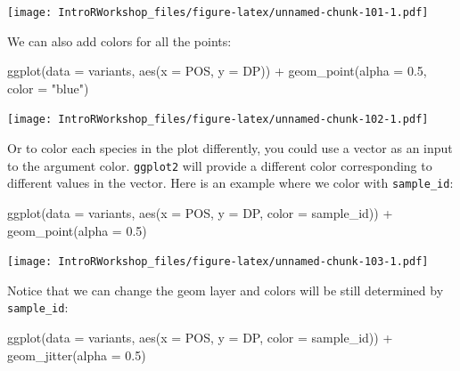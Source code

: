 \documentclass[
]{book}
\newenvironment{Shaded}{\begin{snugshade}}{\end{snugshade}}
\newcommand{\AttributeTok}[1]{\textcolor[rgb]{0.77,0.63,0.00}{#1}}
\newcommand{\FloatTok}[1]{\textcolor[rgb]{0.00,0.00,0.81}{#1}}
\newcommand{\FunctionTok}[1]{\textcolor[rgb]{0.00,0.00,0.00}{#1}}
\newcommand{\NormalTok}[1]{#1}
\newcommand{\SpecialCharTok}[1]{\textcolor[rgb]{0.00,0.00,0.00}{#1}}
\newcommand{\StringTok}[1]{\textcolor[rgb]{0.31,0.60,0.02}{#1}}
\begin{document}
\texttt{[image: IntroRWorkshop\_files/figure-latex/unnamed-chunk-101-1.pdf]}

We can also add colors for all the points:

\begin{Shaded}
\begin{Highlighting}[]
\FunctionTok{ggplot}\NormalTok{(}\AttributeTok{data =}\NormalTok{ variants, }\FunctionTok{aes}\NormalTok{(}\AttributeTok{x =}\NormalTok{ POS, }\AttributeTok{y =}\NormalTok{ DP)) }\SpecialCharTok{+}
  \FunctionTok{geom\_point}\NormalTok{(}\AttributeTok{alpha =} \FloatTok{0.5}\NormalTok{, }\AttributeTok{color =} \StringTok{"blue"}\NormalTok{)}
\end{Highlighting}
\end{Shaded}

\texttt{[image: IntroRWorkshop\_files/figure-latex/unnamed-chunk-102-1.pdf]}

Or to color each species in the plot differently, you could use a vector as an input to the argument color. \texttt{ggplot2} will provide a different color corresponding to different values in the vector. Here is an example where we color with \texttt{sample\_id}:

\begin{Shaded}
\begin{Highlighting}[]
\FunctionTok{ggplot}\NormalTok{(}\AttributeTok{data =}\NormalTok{ variants, }\FunctionTok{aes}\NormalTok{(}\AttributeTok{x =}\NormalTok{ POS, }\AttributeTok{y =}\NormalTok{ DP, }\AttributeTok{color =}\NormalTok{ sample\_id)) }\SpecialCharTok{+}
  \FunctionTok{geom\_point}\NormalTok{(}\AttributeTok{alpha =} \FloatTok{0.5}\NormalTok{)}
\end{Highlighting}
\end{Shaded}

\texttt{[image: IntroRWorkshop\_files/figure-latex/unnamed-chunk-103-1.pdf]}

Notice that we can change the geom layer and colors will be still determined by \texttt{sample\_id}:

\begin{Shaded}
\begin{Highlighting}[]
\FunctionTok{ggplot}\NormalTok{(}\AttributeTok{data =}\NormalTok{ variants, }\FunctionTok{aes}\NormalTok{(}\AttributeTok{x =}\NormalTok{ POS, }\AttributeTok{y =}\NormalTok{ DP, }\AttributeTok{color =}\NormalTok{ sample\_id)) }\SpecialCharTok{+}
  \FunctionTok{geom\_jitter}\NormalTok{(}\AttributeTok{alpha =} \FloatTok{0.5}\NormalTok{)}
\end{Highlighting}
\end{Shaded}
\end{document}
